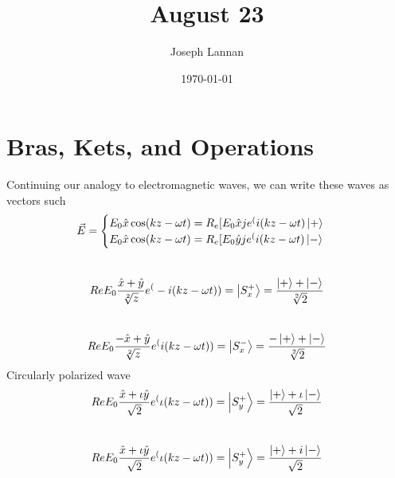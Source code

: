 \documentclass{article}
\title{August 23}
\author{Joseph Lannan}
\date{\today}
\begin{document}
\section{Bras, Kets, and Operations}
Continuing our analogy to electromagnetic waves, we can write these waves as vectors such
$$
\vec{E} = 
		\begin{cases}
			E_0 \hat{x} \cos(kz - \omega t) = R_e [E_0 \hat{x}je^(i(kz - \omega t) \ket{+} \\
			E_0 \hat{x} \cos(kz - \omega t) = R_e [E_0 \hat{y}je^(i(kz - \omega t) \ket{-}
	   \end{cases} \\
$$ \\
$$
Re E_0 \frac{ \hat{x} + \hat{y}}{ \sqrt[2]{z}} e^(-i(kz - \omega t)) = \ket{ S_x^+ } = \frac{ \ket{+} + \ket{-}}{ \sqrt[2]{2}} $$ \\ 
$$
Re  E_0 \frac{- \hat{x} + \hat{y}}{ \sqrt[2]{z}} e^(i(kz - \omega t)) = \ket{ S_x^- } = \frac{- \ket{+} + \ket{-}}{ \sqrt[2]{2}}
$$
Circularly polarized wave
$$
Re E_0 \frac{ \hat{x} + \iota \hat{y} }{ \sqrt{2}} e^( \iota (kz - \omega t)) = \ket{S_y^+} = \frac{ \ket{+} + \iota \ket{-}}{ \sqrt{2}}$$ \\
$$
Re E_0 \frac{ \hat{x} + \iota \hat{y} }{ \sqrt{2}} e^( \iota (kz -\omega t)) = \ket{S_y^+} = \frac{ \ket{+} + i \ket{-}}{ \sqrt{2}}
$$
\end{document}
